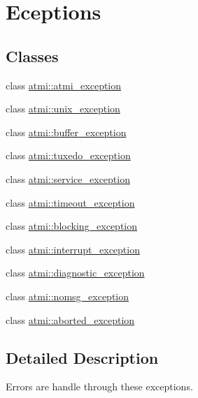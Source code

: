 \hypertarget{group__errors}{\section{Eceptions}
\label{group__errors}
}
\subsection*{Classes}
\begin{DoxyCompactItemize}
\item 
class \hyperlink{classatmi_1_1atmi__exception}{atmi\+::atmi\+\_\+exception}
\item 
class \hyperlink{classatmi_1_1unix__exception}{atmi\+::unix\+\_\+exception}
\item 
class \hyperlink{classatmi_1_1buffer__exception}{atmi\+::buffer\+\_\+exception}
\item 
class \hyperlink{classatmi_1_1tuxedo__exception}{atmi\+::tuxedo\+\_\+exception}
\item 
class \hyperlink{classatmi_1_1service__exception}{atmi\+::service\+\_\+exception}
\item 
class \hyperlink{classatmi_1_1timeout__exception}{atmi\+::timeout\+\_\+exception}
\item 
class \hyperlink{classatmi_1_1blocking__exception}{atmi\+::blocking\+\_\+exception}
\item 
class \hyperlink{classatmi_1_1interrupt__exception}{atmi\+::interrupt\+\_\+exception}
\item 
class \hyperlink{classatmi_1_1diagnostic__exception}{atmi\+::diagnostic\+\_\+exception}
\item 
class \hyperlink{classatmi_1_1nomsg__exception}{atmi\+::nomsg\+\_\+exception}
\item 
class \hyperlink{classatmi_1_1aborted__exception}{atmi\+::aborted\+\_\+exception}
\end{DoxyCompactItemize}


\subsection{Detailed Description}
Errors are handle through these exceptions. 